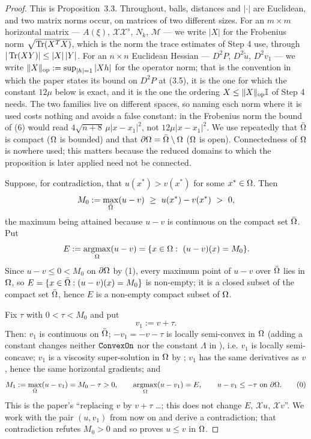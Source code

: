 \begin{proof}
This is Proposition~3.3. Throughout, balls, distances and $|\cdot|$ are Euclidean, and two
matrix norms occur, on matrices of two different sizes. For an $m\times m$ horizontal
matrix --- $A(\xi)$, $\mathcal X\mathcal X^{s}$, $N_k$, $\mathcal M$ --- we write $|X|$ for
the Frobenius norm $\sqrt{\operatorname{Tr}(X^{T}X)}$, which is the norm the trace estimates of Step 4
use, through $|\operatorname{Tr}(XY)|\le|X|\,|Y|$. For an $n\times n$ Euclidean Hessian --- $D^{2}P$,
$D^{2}\tilde u$, $D^{2}v_1$ --- we write $\|X\|_{\rm op}:=\sup_{|h|=1}|Xh|$ for the
operator norm; that is the convention in which the paper states its bound on $D^{2}P$ at
(3.5), it is the one for which the constant $12\mu$ below is exact, and it is the one
the ordering $X\le\|X\|_{\rm op}\mathbb{I}$ of Step 4 needs. The two families live on different
spaces, so naming each norm where it is used costs nothing and avoids a false constant: in
the Frobenius norm the bound of (6) would read $4\sqrt{n+8}\,\mu|x-x_1|^{2}$, not
$12\mu|x-x_1|^{2}$. We use repeatedly that $\bar{\Omega}$ is compact ($\Omega$ is
bounded) and that $\partial\Omega=\bar{\Omega}\setminus\Omega$ ($\Omega$ is open). Connectedness of $\Omega$ is
nowhere used; this matters because the reduced domains to which the proposition is later
applied need not be connected.

Suppose, for contradiction, that $u(x^{*})>v(x^{*})$ for some $x^{*}\in\Omega$. Then
\[
 M_0:=\max_{\bar\Om}(u-v)\ \ge\ u(x^{*})-v(x^{*})\ >\ 0 ,
\]
the maximum being attained because $u-v$ is continuous on the compact set $\bar{\Omega}$. Put
\[
 E:=\operatorname*{argmax}_\Omega(u-v)=\{x\in\Omega:\ (u-v)(x)=M_0\} .
\]
Since $u-v\le0<M_0$ on $\partial\Omega$ by (1), every maximum point of $u-v$ over $\bar{\Omega}$ lies
in $\Omega$, so $E=\{x\in\bar{\Omega}:(u-v)(x)=M_0\}$ is non-empty; it is a closed subset of the
compact set $\bar{\Omega}$, hence $E$ is a non-empty compact subset of $\Omega$.

Fix $\tau$ with $0<\tau<M_0$ and put
\[
 v_1:=v+\tau .
\]
Then: $v_1$ is continuous on $\bar{\Omega}$; $-v_1=-v-\tau$ is locally semi-convex in $\Omega$
(adding a constant changes neither $\texttt{ConvexOn}$ nor the constant $\Lambda$ in
), i.e. $v_1$ is locally semi-concave; $v_1$ is a viscosity
super-solution in $\Omega$ by ; $v_1$ has the same
derivatives as $v$, hence the same horizontal gradients; and
\[
 M_1:=\max_{\bar{\Omega}}(u-v_1)=M_0-\tau>0,\qquad \operatorname*{argmax}_\Omega(u-v_1)=E,\qquad
 u-v_1\le-\tau\ \text{on}\ \partial\Omega . \tag{0}
\]
This is the paper's ``replacing $v$ by $v+\tau$ \dots; this does not change $E$,
$\mathcal Xu$, $\mathcal Xv$''. We work with the pair $(u,v_1)$ from now on and derive a
contradiction; that contradiction refutes $M_0>0$ and so proves $u\le v$ in $\Omega$.


\end{proof}
